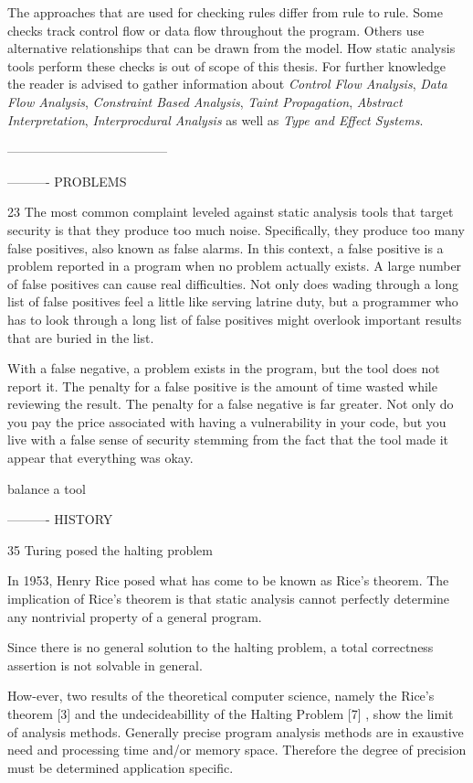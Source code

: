 The approaches that are used for checking rules differ from rule to rule. Some checks track control flow or data flow throughout the program. Others use alternative relationships that can be drawn from the model. How static analysis tools perform these checks is out of scope of this thesis. For further knowledge the reader is advised to gather information about \textit{Control Flow Analysis}, \textit{Data Flow Analysis}, \textit{Constraint Based Analysis}, \textit{Taint Propagation}, \textit{Abstract Interpretation}, \textit{Interprocdural Analysis }as well as \textit{Type and Effect Systems}. 

--------------------------------------




----------
PROBLEMS

23
The most common complaint leveled against static analysis tools that
target security is that they produce too much noise. Specifically, they produce too many false positives, also known as false alarms. In this context, a
false positive is a problem reported in a program when no problem actually
exists. A large number of false positives can cause real difficulties. Not only
does wading through a long list of false positives feel a little like serving
latrine duty, but a programmer who has to look through a long list of false
positives might overlook important results that are buried in the list.

 With a false negative, a problem exists in the
program, but the tool does not report it. The penalty for a false positive is the
amount of time wasted while reviewing the result. The penalty for a false
negative is far greater. Not only do you pay the price associated with having
a vulnerability in your code, but you live with a false sense of security stemming from the fact that the tool made it appear that everything was okay.

balance a tool

----------
HISTORY

35
Turing posed the halting problem

In 1953, Henry Rice posed what has come to be known as Rice’s theorem.
The implication of Rice’s theorem is that static analysis cannot perfectly
determine any nontrivial property of a general program. 

Since there is no
general solution to the halting problem, a total correctness assertion is not
solvable in general.

How-ever, two results of the theoretical computer science, namely the Rice’s
theorem [3] and the undecideabillity of the Halting Problem
[7] , show the
limit of analysis methods. Generally precise program analysis methods are
in exaustive need and processing time and/or memory space. Therefore
the degree of precision must be determined application specific.

